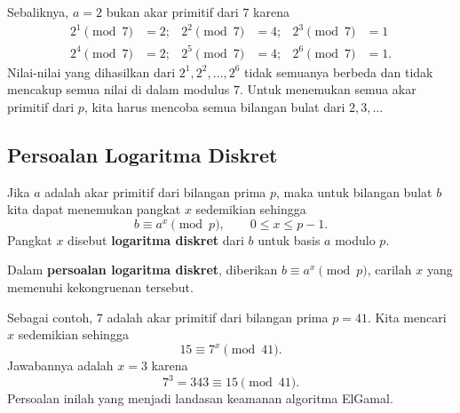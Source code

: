Sebaliknya, $a = 2$ bukan akar primitif dari $7$ karena
\[
\begin{aligned}
2^{1} \pmod{7} &= 2; & 2^{2} \pmod{7} &= 4; & 2^{3} \pmod{7} &= 1 \\
2^{4} \pmod{7} &= 2; & 2^{5} \pmod{7} &= 4; & 2^{6} \pmod{7} &= 1 .
\end{aligned}
\]
Nilai-nilai yang dihasilkan dari $2^{1}, 2^{2}, \dots, 2^{6}$ tidak semuanya
berbeda dan tidak mencakup semua nilai di dalam modulus $7$. Untuk menemukan
semua akar primitif dari $p$, kita harus mencoba semua bilangan bulat dari
$2, 3, \dots$

\subsection{Persoalan Logaritma Diskret}

Jika $a$ adalah akar primitif dari bilangan prima $p$, maka untuk bilangan bulat
$b$ kita dapat menemukan pangkat $x$ sedemikian sehingga
\begin{equation}
b \equiv a^{x} \pmod{p}, \qquad 0 \le x \le p-1 .
\label{eq:dlp-elgamal}
\end{equation}
Pangkat $x$ disebut \textbf{logaritma diskret} dari $b$ untuk basis $a$ modulo
$p$.

Dalam \textbf{persoalan logaritma diskret}, diberikan $b \equiv a^{x} \pmod{p}$,
carilah $x$ yang memenuhi kekongruenan tersebut.

Sebagai contoh, $7$ adalah akar primitif dari bilangan prima $p = 41$. Kita
mencari $x$ sedemikian sehingga
\[ 15 \equiv 7^{x} \pmod{41} . \]
Jawabannya adalah $x = 3$ karena
\[ 7^{3} = 343 \equiv 15 \pmod{41} . \]
Persoalan inilah yang menjadi landasan keamanan algoritma ElGamal.
